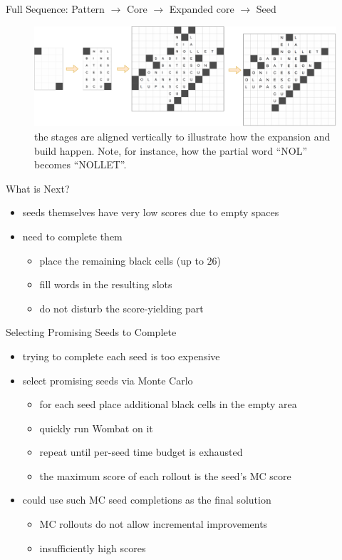 \documentclass[aspectratio=169,usenames,dvipsnames]{beamer}
\newcommand{\bei}{\begin{itemize}}
\newcommand{\eei}{\end{itemize}}
\newcommand{\ie}{\item}
\numberwithin{equation}{section}
\numberwithin{theorem}{section}
\numberwithin{lem}{section}
\numberwithin{df}{section}
\begin{document}
\begin{frame}{Full Sequence: Pattern $\rightarrow$ Core $\rightarrow$ Expanded core $\rightarrow$ Seed}

\begin{figure}
\includegraphics[width=\textwidth]{figs/4part.pdf}
\caption{the stages are aligned vertically to illustrate how the expansion and build happen. Note, for instance, how the partial word ``NOL'' becomes ``NOLLET''. }
\label{fig:pattern}
\end{figure}

\end{frame}


\begin{frame}{What is Next?}

\bei

\ie seeds themselves have very low scores due to empty spaces

\bigskip
\bigskip

\ie need to complete them
\bei
\ie place the remaining black cells (up to $26$)
\ie fill words in the resulting slots
\ie do not disturb the score-yielding part
\eei


\eei


\end{frame}


\begin{frame}{Selecting Promising Seeds to Complete}

\bei

\ie trying to complete each seed is too expensive

\bigskip
\bigskip

\ie select promising seeds via Monte Carlo
\bei
\ie for each seed place additional black cells in the empty area
\ie quickly run {\sc Wombat} on it 
\ie repeat until per-seed time budget is exhausted
\ie the maximum score of each rollout is the seed's MC score
\eei

\bigskip
\bigskip

\ie could use such MC seed completions as the final solution
\bei
\ie MC rollouts do not allow incremental improvements
\ie insufficiently high scores
\eei

\eei


\end{frame}
\end{document}
